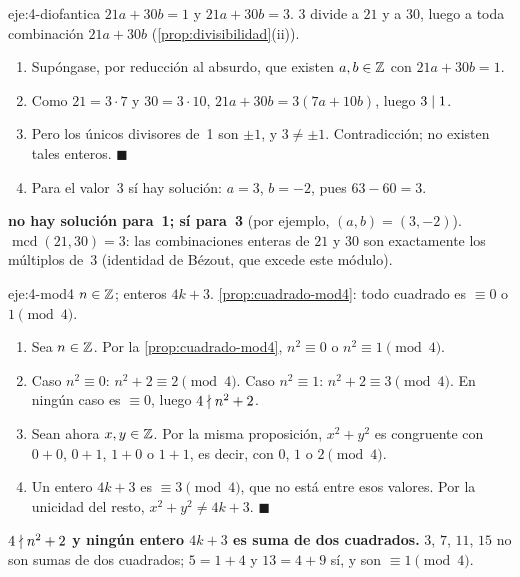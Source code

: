 \begin{solucion}{eje:4-diofantica}
\datos $21a+30b=1$ y $21a+30b=3$.
\planteamiento $3$ divide a $21$ y a $30$, luego a toda combinación $21a+30b$ (\cref{prop:divisibilidad}(ii)).
\pasos
\begin{enumerate}[label=\arabic*.]
  \item Supóngase, por reducción al absurdo, que existen $a,b\in\mathbb{Z}$ con $21a+30b=1$.
  \item Como $21=3\cdot 7$ y $30=3\cdot 10$, $21a+30b=3(7a+10b)$, luego $3\mid 1$.
  \item Pero los únicos divisores de~1 son $\pm1$, y $3\neq\pm1$. Contradicción; no existen tales enteros. $\blacksquare$
  \item Para el valor~3 sí hay solución: $a=3$, $b=-2$, pues $63-60=3$.
\end{enumerate}
\resultado \textbf{no hay solución para~1; sí para~3} (por ejemplo, $(a,b)=(3,-2)$).
\comprobacion $\operatorname{mcd}(21,30)=3$: las combinaciones enteras de $21$ y $30$ son exactamente los múltiplos de~3 (identidad de Bézout, que excede este módulo).
\end{solucion}

\begin{solucion}{eje:4-mod4}
\datos $n\in\mathbb{Z}$; enteros $4k+3$.
\planteamiento \cref{prop:cuadrado-mod4}: todo cuadrado es $\equiv 0$ o $1\pmod 4$.
\pasos
\begin{enumerate}[label=\arabic*.]
  \item Sea $n\in\mathbb{Z}$. Por la \cref{prop:cuadrado-mod4}, $n^{2}\equiv 0$ o $n^{2}\equiv 1\pmod 4$.
  \item Caso $n^{2}\equiv 0$: $n^{2}+2\equiv 2\pmod 4$. Caso $n^{2}\equiv 1$: $n^{2}+2\equiv 3\pmod 4$. En ningún caso es $\equiv 0$, luego $4\nmid n^{2}+2$.
  \item Sean ahora $x,y\in\mathbb{Z}$. Por la misma proposición, $x^{2}+y^{2}$ es congruente con $0+0$, $0+1$, $1+0$ o $1+1$, es decir, con $0$, $1$ o $2\pmod 4$.
  \item Un entero $4k+3$ es $\equiv 3\pmod 4$, que no está entre esos valores. Por la unicidad del resto, $x^{2}+y^{2}\neq 4k+3$. $\blacksquare$
\end{enumerate}
\resultado \textbf{$4\nmid n^{2}+2$ y ningún entero $4k+3$ es suma de dos cuadrados.}
\comprobacion $3$, $7$, $11$, $15$ no son sumas de dos cuadrados; $5=1+4$ y $13=4+9$ sí, y son $\equiv 1\pmod 4$.
\end{solucion}

